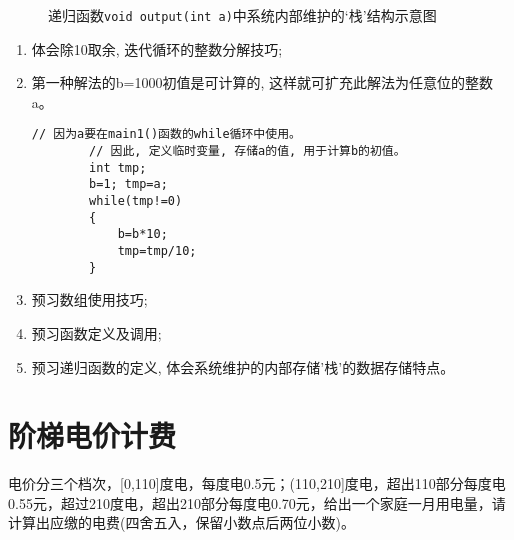 \begin{figure}[H]
\centering
\caption{递归函数\lstinline|void output(int a)|中系统内部维护的`栈'结构示意图}	
\end{figure}

\begin{note}[知识点]
	\begin{enumerate}
		\item 体会除10取余, 迭代循环的整数分解技巧;
		\item 第一种解法的b=1000初值是可计算的, 这样就可扩充此解法为任意位的整数a。
		\begin{lstlisting}[frame=none]
		// 因为a要在main1()函数的while循环中使用。
		// 因此, 定义临时变量, 存储a的值, 用于计算b的初值。
		int tmp; 
		b=1; tmp=a;
		while(tmp!=0)
		{
			b=b*10;
			tmp=tmp/10;
		}
		\end{lstlisting}
		\item 预习数组使用技巧;
		\item 预习函数定义及调用;
		\item 预习递归函数的定义, 体会系统维护的内部存储'栈'的数据存储特点。
	\end{enumerate}
\end{note}

\section{阶梯电价计费}
电价分三个档次，[0,110]度电，每度电0.5元；(110,210]度电，超出110部分每度电0.55元，超过210度电，超出210部分每度电0.70元，给出一个家庭一月用电量，请计算出应缴的电费(四舍五入，保留小数点后两位小数)。

